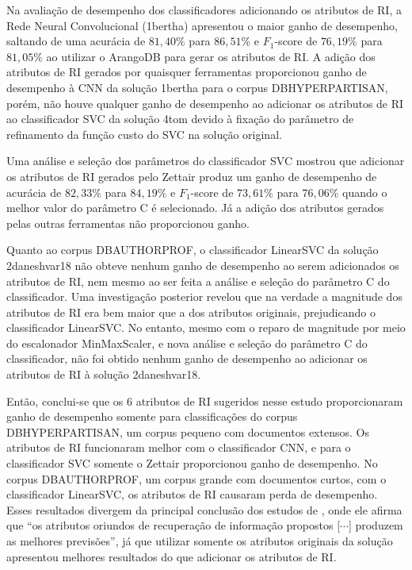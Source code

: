 Na avaliação de desempenho dos classificadores adicionando os atributos de RI, a Rede Neural Convolucional (1\underscore{}bertha) apresentou o maior ganho de desempenho, saltando de uma acurácia de $81,40\%$ para $86,51\%$ e $F_1$-score de $76,19\%$ para $81,05\%$ ao utilizar o ArangoDB para gerar os atributos de RI.
A adição dos atributos de RI gerados por quaisquer ferramentas proporcionou ganho de desempenho à CNN da solução 1\underscore{}bertha para o corpus DB\underscore{}HYPERPARTISAN, porém, não houve qualquer ganho de desempenho ao adicionar os atributos de RI ao classificador SVC da solução 4\underscore{}tom devido à fixação do parâmetro de refinamento da função custo do SVC na solução original.

Uma análise e seleção dos parâmetros do classificador SVC mostrou que adicionar os atributos de RI gerados pelo Zettair produz um ganho de desempenho de acurácia de $82,33\%$ para $84,19\%$ e $F_1$-score de $73,61\%$ para $76,06\%$ quando o melhor valor do parâmetro C é selecionado.
Já a adição dos atributos gerados pelas outras ferramentas não proporcionou ganho.

Quanto ao corpus DB\underscore{}AUTHORPROF, o classificador LinearSVC da solução 2\underscore{}daneshvar18 não obteve nenhum ganho de desempenho ao serem adicionados os atributos de RI, nem mesmo ao ser feita a análise e seleção do parâmetro C do classificador.
Uma investigação posterior revelou que na verdade a magnitude dos atributos de RI era bem maior que a dos atributos originais, prejudicando o classificador LinearSVC.
No entanto, mesmo com o reparo de magnitude por meio do escalonador MinMaxScaler, e nova análise e seleção do parâmetro C do classificador, não foi obtido nenhum ganho de desempenho ao adicionar os atributos de RI à solução 2\underscore{}daneshvar18.

Então, conclui-se que os 6 atributos de RI sugeridos nesse estudo proporcionaram ganho de desempenho somente para classificações do corpus DB\underscore{}HYPERPARTISAN, um corpus pequeno com documentos extensos.
Os atributos de RI funcionaram melhor com o classificador CNN, e para o classificador SVC somente o Zettair proporcionou ganho de desempenho.
No corpus DB\underscore{}AUTHORPROF, um corpus grande com documentos curtos, com o classificador LinearSVC, os atributos de RI causaram perda de desempenho.
Esses resultados divergem da principal conclusão dos estudos de , onde ele afirma que ``os atributos oriundos de recuperação de informação propostos [$\cdots$] produzem as melhores previsões'', já que utilizar somente os atributos originais da solução apresentou melhores resultados do que adicionar os atributos de RI.

